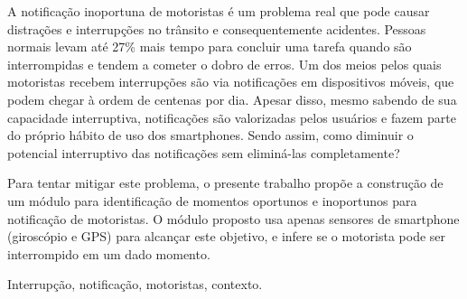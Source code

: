 A notificação inoportuna de motoristas é um problema real que pode causar distrações e interrupções no trânsito e
consequentemente acidentes. Pessoas normais levam até 27\% mais tempo para concluir uma tarefa quando são interrompidas
e tendem a cometer o dobro de erros. Um dos meios pelos quais motoristas recebem interrupções são via notificações
em dispositivos móveis, que podem chegar à ordem de centenas por dia. Apesar disso, mesmo sabendo de sua capacidade
interruptiva, notificações são valorizadas pelos usuários e fazem parte do próprio hábito de uso dos smartphones.
Sendo assim, como diminuir o potencial interruptivo das notificações sem eliminá-las completamente?

Para tentar mitigar este problema, o presente trabalho propõe a construção de um módulo para identificação de
momentos oportunos e inoportunos para notificação de motoristas. O módulo proposto usa apenas sensores de
smartphone (giroscópio e GPS) para alcançar este objetivo, e infere se o motorista pode ser interrompido em
um dado momento.

\begin{keywords}
Interrupção, notificação, motoristas, contexto.
\end{keywords}
